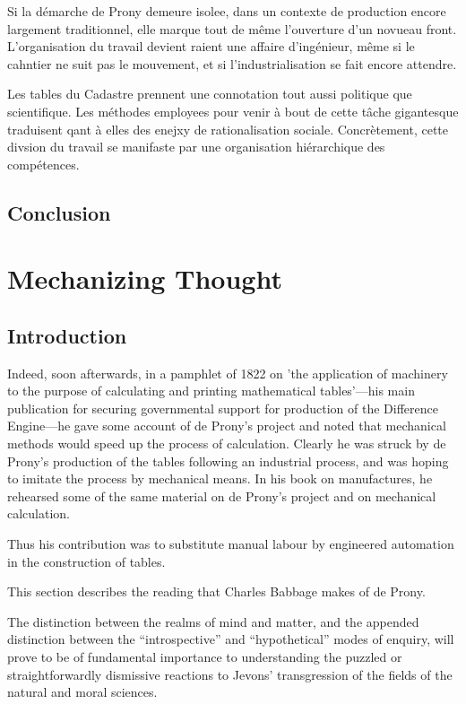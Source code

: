 \documentclass[version=last,draft=true,paper=A4,portrait,twoside=true,twocolumn=false,headinclude=false,footinclude=false,fontsize=12,BCOR=20mm,DIV=calc,pagesize=auto,titlepage=firstiscover,mpinclude=true,open=right,chapterprefix=true,numbers=autoendperiod,headsepline=false,headings=twolinechapter,parskip=false]{scrbook}
\begin{document}
Si la démarche de Prony demeure isolee, dans un contexte de production
encore largement traditionnel, elle marque tout de même l'ouverture d'un
novueau front. L'organisation du travail devient raient une affaire
d’ingénieur, même si le cahntier ne suit pas le mouvement, et si
l'industrialisation se fait encore attendre. 

Les tables du Cadastre prennent une connotation tout aussi politique que
scientifique. Les méthodes employees pour venir à bout de cette tâche
gigantesque traduisent qant à elles des enejxy de rationalisation sociale.
Concrètement, cette divsion du travail se manifaste par une organisation
hiérarchique des compétences. 
\section{Conclusion}
\label{sec:org7fa6574}
\chapter{Mechanizing Thought}
\label{sec:org824126d}
\section{Introduction}
\label{sec:org03f40e3}
Indeed, soon afterwards, in a pamphlet of 1822 on 'the application of
machinery to the purpose of calculating and printing mathematical
tables'---his main publication for securing governmental support for
production of the Difference Engine---he gave some account of de Prony's
project and noted that mechanical methods would speed up the process of
calculation. Clearly he was struck by de Prony's production of the tables
following an industrial process, and was hoping to imitate the process by
mechanical means. In his book on manufactures, he rehearsed some of the
same material on de Prony's project and on mechanical calculation.

Thus his contribution was to substitute manual labour by engineered
automation in the construction of tables.

This section describes the reading that Charles Babbage makes of de Prony.

The distinction between the realms of mind and matter, and the appended
distinction between the ``introspective'' and ``hypothetical'' modes of
enquiry, will prove to be of fundamental importance to understanding the
puzzled or straightforwardly dismissive reactions to Jevons' transgression
of the fields of the natural and moral sciences.
\end{document}
